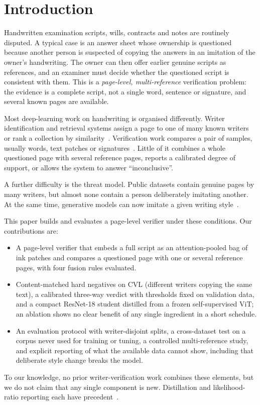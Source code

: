 \section{Introduction}
Handwritten examination scripts, wills, contracts and notes are routinely disputed.
A typical case is an answer sheet whose ownership is questioned because another person is suspected of copying the answers in an imitation of the owner's handwriting.
The owner can then offer earlier genuine scripts as references, and an examiner must decide whether the questioned script is consistent with them.
This is a \emph{page-level, multi-reference} verification problem: the evidence is a complete script, not a single word, sentence or signature, and several known pages are available.

Most deep-learning work on handwriting is organised differently.
Writer identification and retrieval systems assign a page to one of many known writers or rank a collection by similarity~\cite{xing2016deepwriter,he2020fragnet,christlein2017unsupervised,raven2024selfsupervised,peer2023towards}.
Verification work compares a pair of samples, usually words, text patches or signatures~\cite{adak2019intravariable,shaikh2020attention,dey2017signet,chauhan2024selfsupervised}.
Little of it combines a whole questioned page with several reference pages, reports a calibrated degree of support, or allows the system to answer ``inconclusive''.

A further difficulty is the threat model.
Public datasets contain genuine pages by many writers, but almost none contain a person deliberately imitating another.
At the same time, generative models can now imitate a given writing style~\cite{nikolaidou2023wordstylist,nikolaidou2024diffusionpen,vanherle2024vatr,mayr2024zeroshot}.

This paper builds and evaluates a page-level verifier under these conditions.
Our contributions are:
\begin{itemize}
\item A page-level verifier that embeds a full script as an attention-pooled bag of ink patches and compares a questioned page with one or several reference pages, with four fusion rules evaluated.
\item Content-matched hard negatives on CVL (different writers copying the same text), a calibrated three-way verdict with thresholds fixed on validation data, and a compact ResNet-18 student distilled from a frozen self-supervised ViT; an ablation shows no clear benefit of any single ingredient in a short schedule.
\item An evaluation protocol with writer-disjoint splits, a cross-dataset test on a corpus never used for training or tuning, a controlled multi-reference study, and explicit reporting of what the available data cannot show, including that deliberate style change breaks the model.
\end{itemize}
To our knowledge, no prior writer-verification work combines these elements, but we do not claim that any single component is new.
Distillation and likelihood-ratio reporting each have precedent~\cite{tsourounis2023leveraging,ypma2024evidential}.

